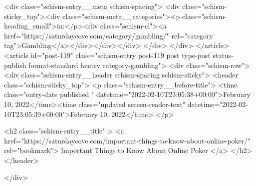 {		<div class="schism-entry__meta schism-spacing">			<div class="schism-sticky_top"><div class="schism-meta__categories"><p class="schism-heading_small">in:</p><div class="schism-cl"><a href="https://saturdaycove.com/category/gambling/" rel="category tag">Gambling</a></div></div></div>		</div>
	</div>
</article>
<article id="post-119" class="schism-entry post-119 post type-post status-publish format-standard hentry category-gambling">
	<div class="schism-row">		<div class="schism-entry__header schism-spacing schism-sticky">			<header class="schism-sticky_top">				<p class="schism-entry__before-title">
					<time class="entry-date published " datetime="2022-02-10T23:05:38+00:00">February 10, 2022</time><time class="updated screen-reader-text" datetime="2022-02-10T23:05:39+00:00">February 10, 2022</time>				</p>

				<h2 class="schism-entry__title" >
					<a href="https://saturdaycove.com/important-things-to-know-about-online-poker/" rel="bookmark">
						Important Things to Know About Online Poker					</a>
				</h2>
			</header>

					</div>

}
